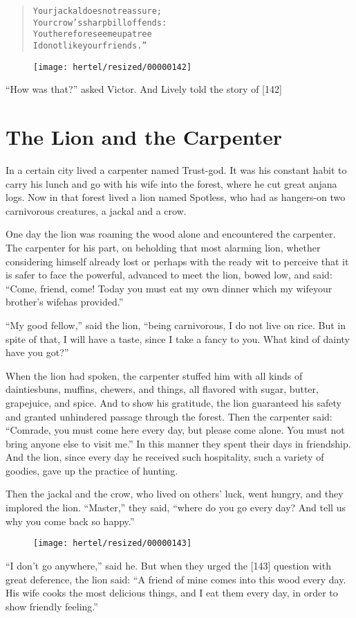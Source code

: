 \documentclass[article, twoside, 10pt]{memoir}
\renewenvironment{verbatim}{%
\begin{quote}%
\vskip -10pt%
\begin{alltt}\normalfont\small}{\end{alltt}%
\end{quote}%
\vskip -10pt
} %
\begin{document}
\begin{verbatim}
Your jackal does not reassure;
    Your crow's sharp bill offends:
You therefore see me up a tree{\textemdash}
    I do not like your friends.”
\end{verbatim}
\begin{figure}[p]\texttt{[image: hertel/resized/00000142]}\end{figure}``How was that?'' asked Victor. And Lively told the story of [142]

\chapter{The Lion and the Carpenter}

In a certain city lived a carpenter named Trust-god. It was his
constant habit to carry his lunch and go with his wife into the
forest, where he cut great anjana logs. Now in that forest lived a
lion named Spotless, who had as hangers-on two carnivorous
creatures, a jackal and a crow.

One day the lion was roaming the wood alone and encountered the
carpenter. The carpenter for his part, on beholding that most
alarming lion, whether considering himself already lost or perhaps
with the ready wit to perceive that it is safer to face the
powerful, advanced to meet the lion, bowed low, and said:
``Come, friend, come! Today you must eat my own dinner which my wife{\textemdash}your brother's wife{\textemdash}has provided.''

``My good fellow,'' said the lion,
``being carnivorous, I do not live on rice. But in spite of that, I will have a taste, since I take a fancy to you. What kind of dainty have you got?''

When the lion had spoken, the carpenter stuffed him with all kinds
of dainties{\textemdash}buns, muffins, chewers, and things, all flavored with
sugar, butter, grapejuice, and spice. And to show his gratitude,
the lion guaranteed his safety and granted unhindered passage
through the forest. Then the carpenter said:
``Comrade, you must come here every day, but please come alone. You must not bring anyone else to visit me.''
In this manner they spent their days in friendship. And the lion,
since every day he received such hospitality, such a variety of
goodies, gave up the practice of hunting.

Then the jackal and the crow, who lived on others' luck, went
hungry, and they implored the lion. ``Master,'' they said,
``where do you go every day? And tell us why you come back so happy.''
\begin{figure}[p]\texttt{[image: hertel/resized/00000143]}\end{figure}``I don't go anywhere,'' said he. But when they urged the [143]
question with great deference, the lion said:
``A friend of mine comes into this wood every day. His wife cooks the most delicious things, and I eat them every day, in order to show friendly feeling.''
\end{document}
